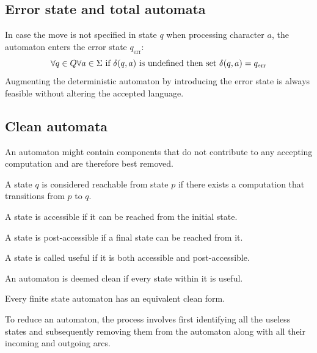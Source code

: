 \subsection{Error state and total automata}
In case the move is not specified in state $q$ when processing character $a$, the automaton enters the error state $q_{\text{err}}$:
\[\forall q \in Q \forall a \in \Sigma \textnormal{ if } \delta(q,a) \textnormal{ is undefined then set } \delta(q,a)=q_{\text{err}}\]
Augmenting the deterministic automaton by introducing the error state is always feasible without altering the accepted language.

\subsection{Clean automata}
An automaton might contain components that do not contribute to any accepting computation and are therefore best removed.
\begin{definition}
    A state $q$ is considered reachable from state $p$ if there exists a computation that transitions from $p$ to $q$.
\end{definition}
\begin{definition}
    A state is accessible if it can be reached from the initial state. 
\end{definition}
\begin{definition}
    A state is post-accessible if a final state can be reached from it. 
\end{definition}
\begin{definition}
    A state is called useful if it is both accessible and post-accessible.
\end{definition}
\begin{definition}
    An automaton is deemed  clean if every state within it is useful.
\end{definition}
\begin{property}
    Every finite state automaton has an equivalent clean form.
\end{property}    
To reduce an automaton, the process involves first identifying all the useless states and subsequently removing them from the automaton along with all their incoming and outgoing arcs.





